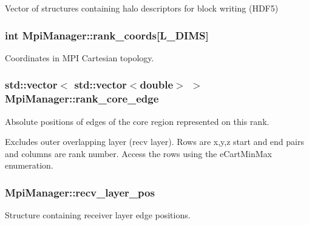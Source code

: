 Vector of structures containing halo descriptors for block writing (H\+D\+F5) 

\subsubsection[{\texorpdfstring{rank\+\_\+coords}{rank_coords}}]{\setlength{\rightskip}{0pt plus 5cm}int Mpi\+Manager\+::rank\+\_\+coords\mbox{[}{\bf L\+\_\+\+D\+I\+MS}\mbox{]}}\hypertarget{class_mpi_manager_a54a3ad1d90d1508ebc82f81655d917f8}{}\label{class_mpi_manager_a54a3ad1d90d1508ebc82f81655d917f8}


Coordinates in M\+PI Cartesian topology. 

\subsubsection[{\texorpdfstring{rank\+\_\+core\+\_\+edge}{rank_core_edge}}]{\setlength{\rightskip}{0pt plus 5cm}std\+::vector$<$ std\+::vector$<$double$>$ $>$ Mpi\+Manager\+::rank\+\_\+core\+\_\+edge}\hypertarget{class_mpi_manager_a0211cd784c9ed1514d5968599e794313}{}\label{class_mpi_manager_a0211cd784c9ed1514d5968599e794313}


Absolute positions of edges of the core region represented on this rank. 

Excludes outer overlapping layer (recv layer). Rows are x,y,z start and end pairs and columns are rank number. Access the rows using the e\+Cart\+Min\+Max enumeration. 
\subsubsection[{\texorpdfstring{recv\+\_\+layer\+\_\+pos}{recv_layer_pos}}]{ Mpi\+Manager\+::recv\+\_\+layer\+\_\+pos}\hypertarget{class_mpi_manager_ad1ff57a97ec56efc1690dd3a5a52fd64}{}\label{class_mpi_manager_ad1ff57a97ec56efc1690dd3a5a52fd64}


Structure containing receiver layer edge positions. 


